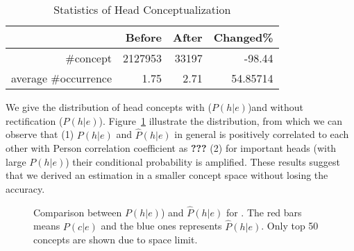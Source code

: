 \begin{table}[htbp]
\vspace{-4mm}
  \centering
  \caption{Statistics of Head Conceptualization}
  \small
    \begin{tabular}{rrrr}
    \toprule
          & Before & After & Changed\% \\
    \midrule
    \#concept & 2127953 & 33197 & -98.44 \\
    average \#occurrence & 1.75  & 2.71  & 54.85714 \\
    \bottomrule
    \end{tabular}%
  \label{tab:nhc}%
\end{table}%


We give the distribution of head concepts with ($P(h|e)$)and without rectification ($\hat{P}(h|e)$).  Figure~\ref{fig:hac} illustrate the distribution, from which we can observe that (1) $P(h|e)$ and $\hat{P}(h|e)$ in general is positively correlated to each other with Person correlation coefficient as {\bf ???} (2) for important heads (with large $P(h|e)$) their conditional probability is amplified. These results suggest that we derived an estimation in a smaller concept space without losing the accuracy.


\begin{figure}[!tb]
\vspace{-8mm}
\centering
\small
{}
\vspace{-8mm}
\caption{Comparison between $P(h|e)$) and $\hat{P}(h|e)$ for . \small The red bars means $P(c|e)$ and the blue ones represents $\hat{P}(h|e)$. Only top 50 concepts are shown due to space limit.  }
\label{fig:hac}
\vspace{-6mm}
\vspace{-8mm}
\vspace{-6mm}
\end{figure}

